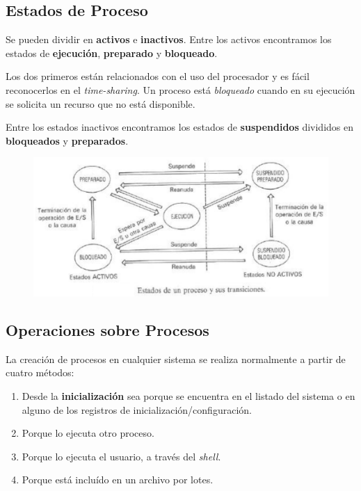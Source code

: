 \documentclass[10pt,a4paper]{article}
\begin{document}
\subsection{Estados de Proceso}
Se pueden dividir en \textbf{activos} e \textbf{inactivos}.
Entre los activos encontramos los estados de \textbf{ejecución}, \textbf{preparado} y \textbf{bloqueado}.

Los dos primeros están relacionados con el uso del procesador y es fácil reconocerlos en el \textit{time-sharing}. Un proceso está \textit{bloqueado} cuando en su ejecución se solicita un recurso que no está disponible.

Entre los estados inactivos encontramos los estados de \textbf{suspendidos} divididos en \textbf{bloqueados} y \textbf{preparados}.

\begin{figure}[h!]
  \label{fig12}
  \centering
  \hbox{\includegraphics[width=\textwidth-\fboxrule-\fboxrule]{fig2.png}}  
\end{figure}

\subsection{Operaciones sobre Procesos}
La creación de procesos en cualquier sistema se realiza normalmente a partir de cuatro métodos:
\begin{enumerate}
\item Desde la \textbf{inicialización} sea porque se encuentra en el listado del sistema o en alguno de los registros de inicialización/configuración.
\item Porque lo ejecuta otro proceso.
\item Porque lo ejecuta el usuario, a través del \textit{shell}.
\item Porque está incluído en un archivo por lotes.
\end{enumerate}
\end{document}
